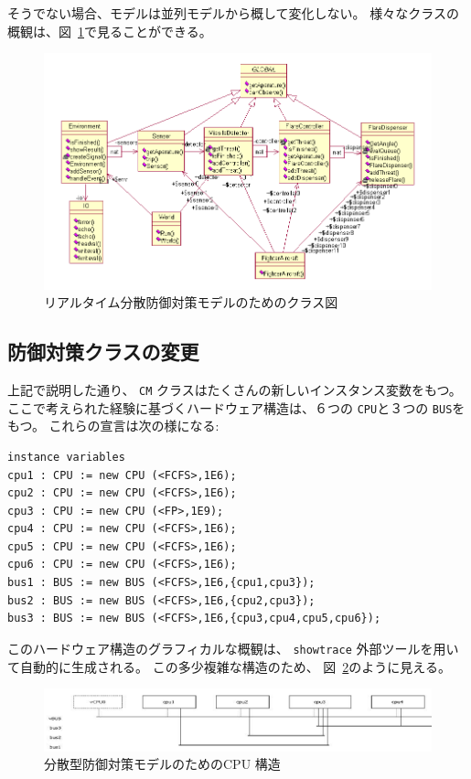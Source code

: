 \documentclass[\pformat,12pt]{jreport}
\begin{document}
そうでない場合、モデルは並列モデルから概して変化しない。
様々なクラスの概観は、図~\ref{fig:classdiagvice}で見ることができる。

\begin{figure}
\begin{center}
\includegraphics[width=\textwidth]{viceCMclassdiag}
\end{center}
\caption{リアルタイム分散防御対策モデルのためのクラス図\label{fig:classdiagvice}}
\end{figure}

\subsection{防御対策クラスの変更}

上記で説明した通り、 \texttt{CM} クラスはたくさんの新しいインスタンス変数をもつ。
ここで考えられた経験に基づくハードウェア構造は、６つの \texttt{CPU}と３つの \texttt{BUS}をもつ。
これらの宣言は次の様になる: 

\begin{lstlisting}
instance variables
cpu1 : CPU := new CPU (<FCFS>,1E6);
cpu2 : CPU := new CPU (<FCFS>,1E6);
cpu3 : CPU := new CPU (<FP>,1E9);
cpu4 : CPU := new CPU (<FCFS>,1E6);
cpu5 : CPU := new CPU (<FCFS>,1E6);
cpu6 : CPU := new CPU (<FCFS>,1E6);
bus1 : BUS := new BUS (<FCFS>,1E6,{cpu1,cpu3});
bus2 : BUS := new BUS (<FCFS>,1E6,{cpu2,cpu3});
bus3 : BUS := new BUS (<FCFS>,1E6,{cpu3,cpu4,cpu5,cpu6});
\end{lstlisting}

このハードウェア構造のグラフィカルな概観は、 \texttt{showtrace} 外部ツールを用いて自動的に生成される。
この多少複雑な構造のため、 図~\ref{fig:cpuarchitecture}のように見える。

\begin{figure}
\begin{center}
\includegraphics[width=\textwidth]{cpuarchitecture}
\end{center}
\caption{分散型防御対策モデルのためのCPU 構造
\label{fig:cpuarchitecture}}
\end{figure}
\end{document}
